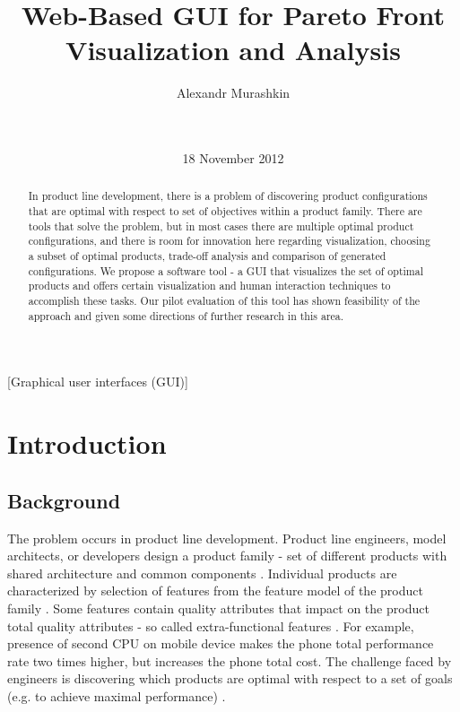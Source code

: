 \documentclass{acm_proc_article-sp}
\begin{document}
\title{Web-Based GUI for Pareto Front Visualization and Analysis}


\author{
\alignauthor
Alexandr Murashkin \\
         \\
       \\
}

\date{18 November 2012}
\maketitle

\begin{abstract}
In product line development, there is a problem of discovering product configurations that are optimal with respect to set of objectives within a product family. There are tools that solve the problem, but in most cases there are multiple optimal product configurations, and there is room for innovation here regarding visualization, choosing a subset of optimal products, trade-off analysis and comparison of generated configurations. We propose a software tool - a GUI that visualizes the set of optimal products and offers certain visualization and human interaction techniques to accomplish these tasks. Our pilot evaluation of this tool has shown feasibility of the approach and given some directions of further research in this area.  
\end{abstract}


[Graphical user interfaces (GUI)]



\section{Introduction}

\subsection{Background}

The problem occurs in product line development. Product line engineers, model architects, or developers design a product family - set of different products with shared architecture and common components \cite{ClementsNorthrop2001}. Individual products are characterized by selection of features from the feature model of the product family \cite{Kang90}. Some features contain quality attributes that impact on the product total quality attributes - so called extra-functional features \cite{Benavides05automatedreasoning}. For example, presence of second CPU on mobile device makes the phone total performance rate two times higher, but increases the phone total cost. The challenge faced by engineers is discovering which products are optimal with respect to a set of goals (e.g. to achieve maximal performance) \cite{474}.
\end{document}
